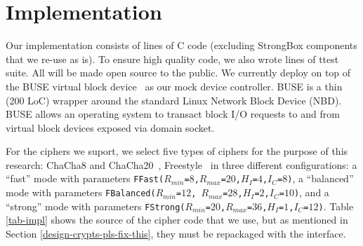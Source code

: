 

\section{Implementation} \label{subsec:implementation}




Our \sys implementation consists of \locTotal lines of C code (excluding
StrongBox components that we re-use as is).  To ensure high quality code,
we also wrote \locTest lines of ttest suite.  All will be made open source
to the public.  We currently deploy \sys on top of the BUSE virtual block
device~\cite{BUSE} as our mock device controller.  BUSE is a thin (200
LoC) wrapper around the standard Linux Network Block Device (NBD).  BUSE
allows an operating system to transact block I/O requests to and from
virtual block devices exposed via domain socket.



For the ciphers we suport, we select five types of ciphers for the purpose
of this research: ChaCha8 and ChaCha20~\cite{ChaCha20},
Freestyle~\cite{Freestyle} in three different configurations: a ``fast''
mode with parameters
\texttt{FFast($R_{min}$=$8$,$R_{max}$=$20$,$H_I$=$4$,$I_C$=$8$)}, a
``balanced'' mode with parameters \texttt{FBalanced($R_{min}$=$12$,
  $R_{max}$=$28$,$H_I$=$2$,$I_C$=$10$)}, and a ``strong'' mode with
parameters
\texttt{FStrong($R_{min}$=$20$,$R_{max}$=$36$,$H_I$=$1$,$I_C$=$12$)}.
%
%
Table \ref{tab-impl} shows the source of the cipher code that we use, but
as mentioned in Section \ref{design-crypts-pls-fix-this}, they must be
repackaged with the \sysB interface.


